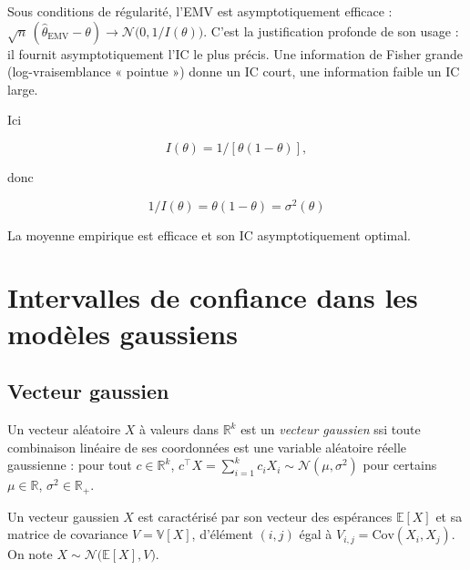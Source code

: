 \begin{remarque}
Sous conditions de régularité, l'EMV est asymptotiquement efficace : $\sqrt n\,(\hat\theta_{\text{EMV}} - \theta) \to \mathcal N\big(0, 1/I(\theta)\big)$. C'est la justification profonde de son usage : il fournit asymptotiquement l'IC le plus précis. Une information de Fisher grande (log-vraisemblance « pointue ») donne un IC court, une information faible un IC large.
\end{remarque}

\begin{exemple} 
Ici 

$$
I(\theta) = 1/[\theta(1-\theta)],
$$ 

donc 

$$
1/I(\theta) = \theta(1-\theta) = \sigma^2(\theta)
$$ 

La moyenne empirique est efficace et son IC asymptotiquement optimal.
\end{exemple}

\section{Intervalles de confiance dans les modèles gaussiens}

\subsection{Vecteur gaussien}

\medskip

\begin{mdframed}
\begin{definition}
Un vecteur aléatoire $X$ à valeurs dans $\mathbb R^k$ est un \textit{vecteur gaussien} ssi toute combinaison linéaire de ses coordonnées est une variable aléatoire réelle gaussienne : pour tout $c \in \mathbb R^k$, $c^\top X = \sum_{i=1}^k c_i X_i \sim \mathcal N(\mu,\sigma^2)$ pour certains $\mu \in \mathbb R$, $\sigma^2 \in \mathbb R_+$.
\end{definition}
\end{mdframed}

\medskip

\begin{mdframed}
\begin{proposition}
Un vecteur gaussien $X$ est caractérisé par son vecteur des espérances $\mathbb E[X]$ et sa matrice de covariance $V = \mathbb V[X]$, d'élément $(i,j)$ égal à $V_{i,j} = \mathrm{Cov}(X_i,X_j)$. On note $X \sim \mathcal N\big(\mathbb E[X], V\big)$.
\end{proposition}
\end{mdframed}

